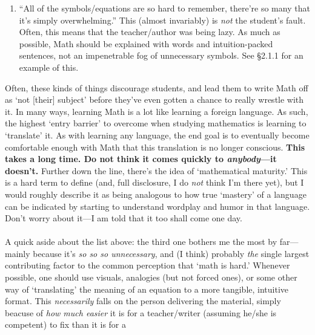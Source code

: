 \documentclass[10pt]{article}
\theoremstyle{definition}
\begin{document}
{\begin{enumerate}
      bake two types of cakes with the following recipes...'' problem.
      We shouldn't pretend that it is.  Instead, we should start
      introducing \emph{intuition} about the more advanced concepts,
      and leave formal discussions of them for another day.  That way,
      we (hopefully) won't overwhelm students, but will still give
      them some sort of appreciation for why the things they're doing
      are important.
    \item ``All of the symbols/equations are so hard to remember,
      there're so many that it's simply overwhelming.''  This (almost
      invariably) is \emph{not} the student's fault.  Often, this
      means that the teacher/author was being lazy.  As much as
      possible, Math should be explained with words and
      intuition-packed sentences, not an impenetrable fog of
      unnecessary symbols.  See \S 2.1.1 for an example of this.
\end{enumerate}
Often, these kinds of things discourage students, and lead them to
write Math off as `not [their] subject' before they've even gotten a
chance to really wrestle with it.  In many ways, learning Math is a
lot like learning a foreign language.  As such, the highest `entry
barrier' to overcome when studying mathematics is learning to
`translate' it.  As with learning any language, the end goal is to
eventually become comfortable enough with Math that this translation
is no longer conscious.  \textbf{This takes a long time.  Do not think
  it comes quickly to \emph{anybody}---it doesn't.}  Further down the
line, there's the idea of `mathematical maturity.'  This is a hard
term to define (and, full disclosure, I do \emph{not} think I'm there
yet), but I would roughly describe it as being analogous to how true
`mastery' of a language can be indicated by starting to understand
wordplay and humor in that language.  Don't worry about it---I am told
that it too shall come one day.\\~\\
A quick aside about the list above: the third one bothers me the most
by far---mainly because it's \emph{so so so unnecessary}, and (I
think) probably \emph{the} single largest contributing factor to the
common perception that `math is hard.'  Whenever possible, one should
use visuals, analogies (but not forced ones), or some other way of
`translating' the meaning of an equation to a more tangible, intuitive
format.  This \emph{necessarily} falls on the person delivering the
material, simply beacuse of \emph{how much easier} it is for a
teacher/writer (assuming he/she is competent) to fix than it is for a
}
\end{document}
